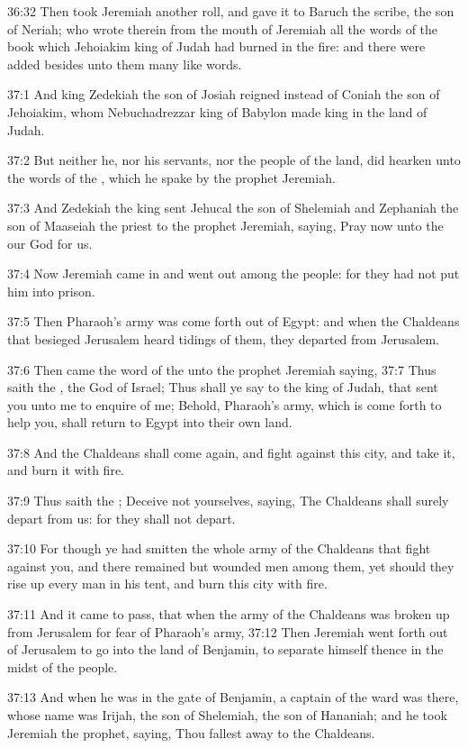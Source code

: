 36:32 Then took Jeremiah another roll, and gave it to Baruch the
scribe, the son of Neriah; who wrote therein from the mouth of
Jeremiah all the words of the book which Jehoiakim king of Judah had
burned in the fire: and there were added besides unto them many like
words.

37:1 And king Zedekiah the son of Josiah reigned instead of Coniah the
son of Jehoiakim, whom Nebuchadrezzar king of Babylon made king in the
land of Judah.

37:2 But neither he, nor his servants, nor the people of the land, did
hearken unto the words of the \LORD, which he spake by the prophet
Jeremiah.

37:3 And Zedekiah the king sent Jehucal the son of Shelemiah and
Zephaniah the son of Maaseiah the priest to the prophet Jeremiah,
saying, Pray now unto the \LORD our God for us.

37:4 Now Jeremiah came in and went out among the people: for they had
not put him into prison.

37:5 Then Pharaoh's army was come forth out of Egypt: and when the
Chaldeans that besieged Jerusalem heard tidings of them, they departed
from Jerusalem.

37:6 Then came the word of the \LORD unto the prophet Jeremiah saying,
37:7 Thus saith the \LORD, the God of Israel; Thus shall ye say to the
king of Judah, that sent you unto me to enquire of me; Behold,
Pharaoh's army, which is come forth to help you, shall return to Egypt
into their own land.

37:8 And the Chaldeans shall come again, and fight against this city,
and take it, and burn it with fire.

37:9 Thus saith the \LORD; Deceive not yourselves, saying, The
Chaldeans shall surely depart from us: for they shall not depart.

37:10 For though ye had smitten the whole army of the Chaldeans that
fight against you, and there remained but wounded men among them, yet
should they rise up every man in his tent, and burn this city with
fire.

37:11 And it came to pass, that when the army of the Chaldeans was
broken up from Jerusalem for fear of Pharaoh's army, 37:12 Then
Jeremiah went forth out of Jerusalem to go into the land of Benjamin,
to separate himself thence in the midst of the people.

37:13 And when he was in the gate of Benjamin, a captain of the ward
was there, whose name was Irijah, the son of Shelemiah, the son of
Hananiah; and he took Jeremiah the prophet, saying, Thou fallest away
to the Chaldeans.

